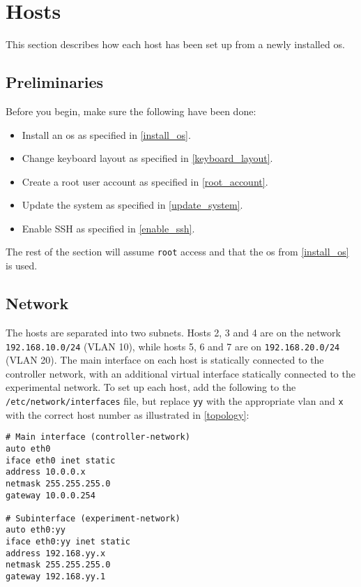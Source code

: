 \chapter{Hosts}

This section describes how each host has been set up from a newly installed \gls{os}.

\section{Preliminaries}

Before you begin, make sure the following have been done:

\begin{itemize}
    \item Install an \gls{os} as specified in \ref{install_os}.
    \item Change keyboard layout as specified in \ref{keyboard_layout}.
    \item Create a root user account as specified in \ref{root_account}.
    \item Update the system as specified in \ref{update_system}.
    \item Enable SSH as specified in \ref{enable_ssh}.
\end{itemize}

The rest of the section will assume \lstinline{root} access and that the \gls{os} from \ref{install_os} is used.


\section{Network}

The hosts are separated into two subnets. Hosts 2, 3 and 4 are on the network \lstinline{192.168.10.0/24} (VLAN 10), while hosts 5, 6 and 7 are on \lstinline{192.168.20.0/24} (VLAN 20). The main interface on each host is statically connected to the controller network, with an additional virtual interface statically connected to the experimental network. To set up each host, add the following to the \lstinline{/etc/network/interfaces} file, but replace \lstinline{yy} with the appropriate \gls{vlan} and \lstinline{x} with the correct host number as illustrated in \ref{topology}:

\begin{verbatim}
# Main interface (controller-network)
auto eth0
iface eth0 inet static
address 10.0.0.x
netmask 255.255.255.0
gateway 10.0.0.254

# Subinterface (experiment-network)
auto eth0:yy
iface eth0:yy inet static
address 192.168.yy.x
netmask 255.255.255.0
gateway 192.168.yy.1
\end{verbatim}

